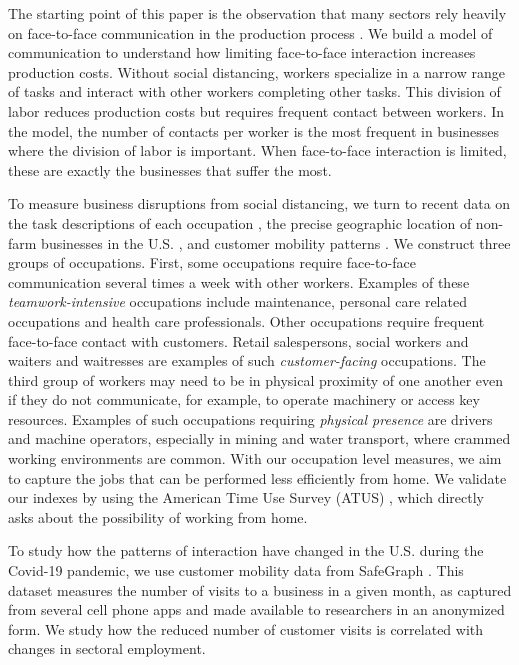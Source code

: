 \documentclass[10pt,letterpaper]{article}
\begin{document}
The starting point of this paper is the observation that many sectors rely heavily on face-to-face communication in the production process \cite{Charlot2004-zr,Tian2019-wq}. We build a model of communication to understand how limiting face-to-face interaction increases production costs. Without social distancing, workers specialize in a narrow range of tasks and interact with other workers completing other tasks. This division of labor reduces production costs but requires frequent contact between workers. In the model, the number of contacts per worker is the most frequent in businesses where the division of labor is important. When face-to-face interaction is limited, these are exactly the businesses that suffer the most.

To measure business disruptions from social distancing, we turn to recent data on the task descriptions of each occupation \cite{National_Center_for_ONET_Development2020-wj}, the precise geographic location of non-farm businesses in the U.S. \cite{CBP}, and customer mobility patterns \cite{SafeGraph2020-gn}. We construct three groups of occupations. First, some occupations require face-to-face communication several times a week with other workers. Examples of these \emph{teamwork-intensive} occupations include maintenance, personal care related occupations and health care professionals. Other occupations require frequent face-to-face contact with customers. Retail salespersons, social workers and waiters and waitresses are examples of such \emph{customer-facing} occupations. The third group of workers may need to be in physical proximity of one another even if they do not communicate, for example, to operate machinery or access key resources. Examples of such occupations requiring \emph{physical presence} are drivers and machine operators, especially in mining and water transport, where crammed working environments are common. With our occupation level measures, we aim to capture the jobs that can be performed less efficiently from home. We validate our indexes by using the American Time Use Survey (ATUS) \cite{ATUS}, which directly asks about the possibility of working from home.  

To study how the patterns of interaction have changed in the U.S. during the Covid-19 pandemic, we use customer mobility data from SafeGraph \cite{SafeGraph2020-gn}. This dataset measures the number of visits to a business in a given month, as captured from several cell phone apps and made available to researchers in an anonymized form. We study how the reduced number of customer visits is correlated with changes in sectoral employment.
\end{document}
